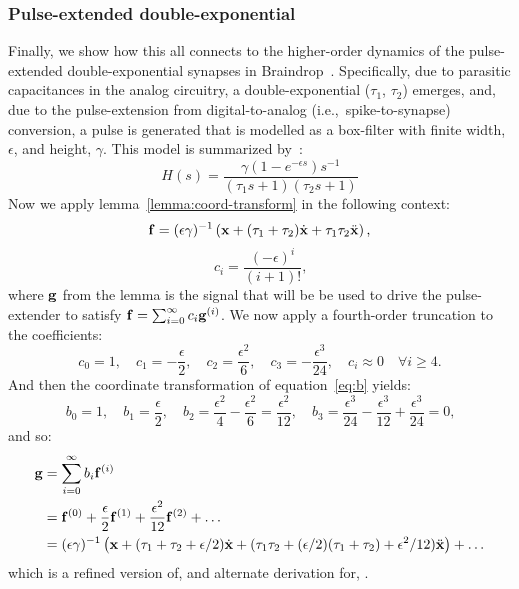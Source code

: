 \subsubsection{Pulse-extended double-exponential}

Finally, we show how this all connects to the higher-order dynamics of the pulse-extended double-exponential synapses in Braindrop~\citep{voelker2017iscas}.
Specifically, due to parasitic capacitances in the analog circuitry, a double-exponential ($\tau_1$, $\tau_2$) emerges, and, due to the pulse-extension from digital-to-analog (i.e.,~spike-to-synapse) conversion, a pulse is generated that is modelled as a box-filter with finite width, $\epsilon$, and height, $\gamma$.
This model is summarized by~\citet[][equation~8]{voelker2017iscas}:
\begin{equation} \label{eq:braindrop-synapse}
H(s) = \frac{ \gamma \left(1 - e^{-\epsilon s} \right) s^{-1}}{ \left( \tau_1 s + 1 \right) \left( \tau_2 s + 1 \right) }
\end{equation}
Now we apply lemma~\ref{lemma:coord-transform} in the following context:
$$
\mathbf{f} = (\epsilon \gamma)^{-1} \left( \mathbf{x} + (\tau_1 + \tau_2) \dot{\mathbf{x}} + \tau_1 \tau_2 \ddot{\mathbf{x}} \right) \text{,}
$$
$$
c_i = \frac{(-\epsilon)^i}{(i + 1)!} \text{,}
$$
where $\mathbf{g}$ from the lemma is the signal that will be be used to drive the pulse-extender to satisfy $\mathbf{f} = \sum_{i=0}^\infty c_i \mathbf{g}^{(i)}$.
We now apply a fourth-order truncation to the coefficients:
$$
c_0 = 1, \quad c_1 = -\frac{\epsilon}{2}, \quad c_2 = \frac{\epsilon^2}{6}, \quad c_3 = -\frac{\epsilon^3}{24}, \quad c_i \approx 0 \quad \forall i \ge 4 \text{.}
$$
And then the coordinate transformation of equation~\ref{eq:b} yields:
$$
b_0 = 1, \quad b_1 = \frac{\epsilon}{2}, \quad b_2 = \frac{\epsilon^2}{4} - \frac{\epsilon^2}{6} = \frac{\epsilon^2}{12}, \quad b_3 = \frac{\epsilon^3}{24} - \frac{\epsilon^3}{12} + \frac{\epsilon^3}{24} = 0 \text{,}
$$
and so:
\begin{align*}
\mathbf{g} &= \sum_{i=0}^\infty b_i \mathbf{f}^{(i)} \\
        &= \mathbf{f}^{(0)} + \frac{\epsilon}{2} \mathbf{f}^{(1)} + \frac{\epsilon^2}{12} \mathbf{f}^{(2)} + \ldots \\
        &= (\epsilon \gamma)^{-1} \left( \mathbf{x} + (\tau_1 + \tau_2 + \epsilon / 2) \dot{\mathbf{x}} + (\tau_1 \tau_2 + (\epsilon / 2 ) (\tau_1 + \tau_2) + \epsilon^2 / 12) \ddot{\mathbf{x}} \right) + \ldots
\end{align*}
which is a refined version of, and alternate derivation for, \citet[][equation~11]{voelker2017iscas}.

